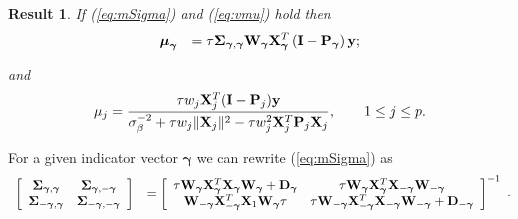 \documentclass[11pt]{article}
\newtheorem{Result}{Result}
\newtheorem{Main Result}{Main Result}
\def\vectorfontone{\bf}
\def\vectorfonttwo{\boldsymbol}
\def\vu{{\vectorfontone u}}                      %
\def\vy{{\vectorfontone y}}                      %
\def\vgamma{{\vectorfonttwo \gamma}}             %
\def\vmu{{\vectorfonttwo \mu}}                   %
\def\matrixfontone{\bf}
\def\matrixfonttwo{\boldsymbol}
\def\mD{{\matrixfontone D}}                      %
\def\mI{{\matrixfontone I}}                      %
\def\mP{{\matrixfontone P}}                      %
\def\mW{{\matrixfontone W}}                      %
\def\mX{{\matrixfontone X}}                      %
\def\mSigma{{\matrixfonttwo \Sigma}}             %
\def\ds{\displaystyle}
\begin{document}
\begin{Result}
	\noindent If (\ref{eq:mSigma}) and (\ref{eq:vmu}) hold then
	\begin{equation}\label{eq:muRearrange2}
	\begin{array}{rl}
	\ds \vmu_{\vgamma}
	& \ds =
	\tau \mSigma_{\vgamma,\vgamma} \mW_{\vgamma} \mX_{\vgamma}^T\left( \mI - \mP_{\vgamma}\right)\vy;
	\end{array}
	\end{equation}
	
	\noindent and
	\begin{equation}\label{eq:muRearrange}
	\ds \mu_j = \frac{\tau w_j \mX_j^T(\mI - \mP_j)\vy
	}{
	\sigma_\beta^{-2} + \tau w_j\|\mX_j\|^2 - \tau w_j^2\mX_j^T\mP_j\mX_j
}, \qquad  1\le j\le p.
\end{equation}


\end{Result}
%

For a given indicator vector $\vgamma$ we can rewrite
(\ref{eq:mSigma}) as
$$
\begin{array}{rl}
\ds \left[ \begin{array}{cc}
\mSigma_{\vgamma,\vgamma}    & \mSigma_{\vgamma,-\vgamma} \\
\mSigma_{-\vgamma,\vgamma}    & \mSigma_{-\vgamma,-\vgamma}
\end{array}
\right]
& \ds =
\left[ \begin{array}{cc}
\tau\mW_{\vgamma}\mX_{\vgamma}^T\mX_{\vgamma}\mW_{\vgamma} + \mD_{\vgamma}
& \tau \mW_{\vgamma}\mX_{\vgamma}^T\mX_{-\vgamma}\mW_{-\vgamma} \\
\mW_{-\vgamma}\mX_{-\vgamma}^T\mX_1\mW_{\vgamma}\tau
& \tau\mW_{-\vgamma}\mX_{-\vgamma}^T\mX_{-\vgamma}\mW_{-\vgamma} + \mD_{-\vgamma}
\end{array}
\right]^{-1}
\end{array}.
$$
\end{document}
